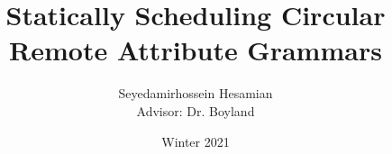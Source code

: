 \newcommand{\theadvisor}{{Dr. Boyland}}
\newcommand{\theuniversity}{{University of Wisconsin-Milwaukee}}
\newcommand{\theyear}{{2021}}

\author[Seyedamirhossein Hesamian]{Seyedamirhossein Hesamian \texorpdfstring{\\{\small Advisor: Dr. Boyland}}{}}

\title{Statically Scheduling Circular Remote Attribute Grammars}
\date{Winter 2021}